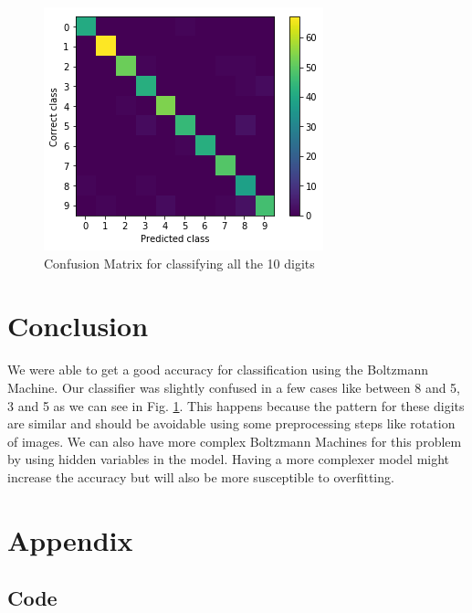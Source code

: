 \documentclass{article}
\begin{document}
\begin{figure}[ht]
  \centering
  \includegraphics[width=\textwidth]{confusion}
  \caption{Confusion Matrix for classifying all the 10 digits}
  \label{fig:confusion}
\end{figure}

\section{Conclusion}
We were able to get a good accuracy for classification using the Boltzmann 
Machine. Our classifier was slightly confused in a few cases like between 
8 and 5, 3 and 5 as we can see in Fig. 
\ref{fig:confusion}. This happens because the pattern for these digits are 
similar and should be avoidable using some preprocessing steps like rotation
of images. We can also have more complex Boltzmann Machines for this problem 
by using hidden variables in the model. Having a more complexer model might
increase the accuracy but will also be more susceptible to overfitting.

\section{Appendix}
\subsection{Code} 
\inputminted{python}{code.py}
\end{document}
